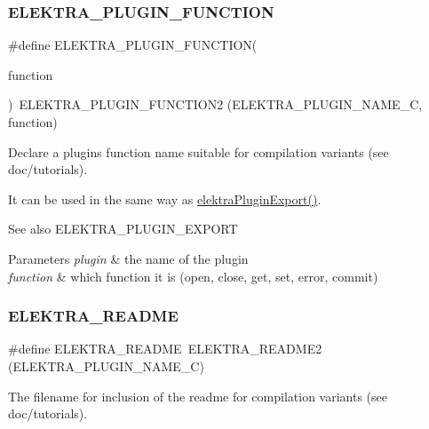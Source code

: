 \subsubsection{\texorpdfstring{E\+L\+E\+K\+T\+R\+A\+\_\+\+P\+L\+U\+G\+I\+N\+\_\+\+F\+U\+N\+C\+T\+I\+ON}{ELEKTRA\_PLUGIN\_FUNCTION}}
{\footnotesize\ttfamily \#define E\+L\+E\+K\+T\+R\+A\+\_\+\+P\+L\+U\+G\+I\+N\+\_\+\+F\+U\+N\+C\+T\+I\+ON(\begin{DoxyParamCaption}\item[{}]{function }\end{DoxyParamCaption})~E\+L\+E\+K\+T\+R\+A\+\_\+\+P\+L\+U\+G\+I\+N\+\_\+\+F\+U\+N\+C\+T\+I\+O\+N2 (E\+L\+E\+K\+T\+R\+A\+\_\+\+P\+L\+U\+G\+I\+N\+\_\+\+N\+A\+M\+E\+\_\+C, function)}



Declare a plugin\textquotesingle{}s function name suitable for compilation variants (see doc/tutorials). 

It can be used in the same way as \hyperlink{group__plugin_ga8dd092048e972a3f0c9c9f54eb41576e}{elektra\+Plugin\+Export()}. \begin{DoxySeeAlso}{See also}
E\+L\+E\+K\+T\+R\+A\+\_\+\+P\+L\+U\+G\+I\+N\+\_\+\+E\+X\+P\+O\+RT
\end{DoxySeeAlso}

\begin{DoxyParams}{Parameters}
{\em plugin} & the name of the plugin \\
\hline
{\em function} & which function it is (open, close, get, set, error, commit) \\
\hline
\end{DoxyParams}
\mbox{\label{group__plugin_gabdcb97b05a83130c32bbde75db80fc50}} 
\subsubsection{\texorpdfstring{E\+L\+E\+K\+T\+R\+A\+\_\+\+R\+E\+A\+D\+ME}{ELEKTRA\_README}}
{\footnotesize\ttfamily \#define E\+L\+E\+K\+T\+R\+A\+\_\+\+R\+E\+A\+D\+ME~E\+L\+E\+K\+T\+R\+A\+\_\+\+R\+E\+A\+D\+M\+E2 (E\+L\+E\+K\+T\+R\+A\+\_\+\+P\+L\+U\+G\+I\+N\+\_\+\+N\+A\+M\+E\+\_\+C)}



The filename for inclusion of the readme for compilation variants (see doc/tutorials). 


